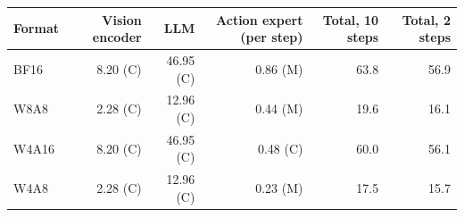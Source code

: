 \centering
\small
\begin{tabular}{lrrrrr}
\toprule
Format & Vision encoder & LLM & Action expert (per step) & Total, 10 steps & Total, 2 steps \\
\midrule
BF16  & 8.20 (C) & 46.95 (C) & 0.86 (M) & 63.8 & 56.9 \\
W8A8  & 2.28 (C) & 12.96 (C) & 0.44 (M) & 19.6 & 16.1 \\
W4A16 & 8.20 (C) & 46.95 (C) & 0.48 (C) & 60.0 & 56.1 \\
W4A8  & 2.28 (C) & 12.96 (C) & 0.23 (M) & 17.5 & 15.7 \\
\bottomrule
\end{tabular}
